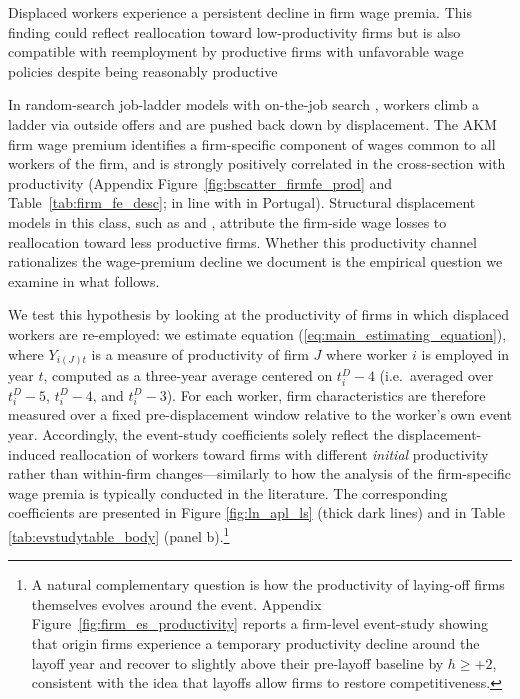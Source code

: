 


Displaced workers experience a persistent decline in firm wage premia. This finding could reflect reallocation toward low-productivity firms but is also compatible with reemployment by productive firms with unfavorable wage policies despite being reasonably productive %

In random-search job-ladder models with on-the-job search \citep[see][for a survey]{Lentz2024}, workers climb a ladder via outside offers and are pushed back down by displacement. The AKM firm wage premium identifies a firm-specific component of wages common to all workers of the firm, and is strongly positively correlated in the cross-section with productivity (Appendix Figure~\ref{fig:bscatter_firmfe_prod} and Table~\ref{tab:firm_fe_desc}; in line with \citealt{card2016bargaining} in Portugal). Structural displacement models in this class, such as \citet{krolikowski2017job} and \citet{Audoly_2024}, attribute the firm-side wage losses to reallocation toward less productive firms. Whether this productivity channel rationalizes the wage-premium decline we document is the empirical question we examine in what follows.


We test this hypothesis by looking at the productivity of firms in which displaced workers are re-employed: we estimate equation (\ref{eq:main_estimating_equation}), where $Y_{i(J)t}$ is a measure of productivity of firm $J$ where worker $i$ is employed in year $t$, computed as a three-year average centered on $t^D_i - 4$ (i.e.\ averaged over $t^D_i - 5$, $t^D_i - 4$, and $t^D_i - 3$). For each worker, firm characteristics are therefore measured over a fixed pre-displacement window relative to the worker's own event year. Accordingly, the event-study coefficients solely reflect the displacement-induced reallocation of workers toward firms with different \textit{initial} productivity rather than within-firm changes---similarly to how the analysis of the firm-specific wage premia is typically conducted in the literature. The corresponding coefficients are presented in Figure \ref{fig:ln_apl_ls} (thick dark lines) and in Table \ref{tab:evstudytable_body} (panel b).\footnote{A natural complementary question is how the productivity of laying-off firms themselves evolves around the event. Appendix Figure~\ref{fig:firm_es_productivity} reports a firm-level event-study showing that origin firms experience a temporary productivity decline around the layoff year and recover to slightly above their pre-layoff baseline by $h \geq +2$, consistent with the idea that layoffs allow firms to restore competitiveness.}


